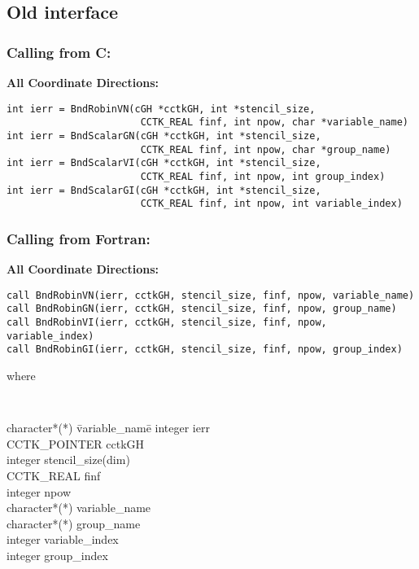 \documentclass{article}
\begin{document}
\subsection{Old interface}

\subsubsection*{Calling from C:}

{\bf All Coordinate Directions:}
\begin{verbatim}
int ierr = BndRobinVN(cGH *cctkGH, int *stencil_size,  
                       CCTK_REAL finf, int npow, char *variable_name)
int ierr = BndScalarGN(cGH *cctkGH, int *stencil_size,  
                       CCTK_REAL finf, int npow, char *group_name)
int ierr = BndScalarVI(cGH *cctkGH, int *stencil_size,  
                       CCTK_REAL finf, int npow, int group_index)
int ierr = BndScalarGI(cGH *cctkGH, int *stencil_size,  
                       CCTK_REAL finf, int npow, int variable_index)
\end{verbatim}


\subsubsection*{Calling from Fortran:}
{\bf All Coordinate Directions:}
\begin{verbatim}
call BndRobinVN(ierr, cctkGH, stencil_size, finf, npow, variable_name)
call BndRobinGN(ierr, cctkGH, stencil_size, finf, npow, group_name)
call BndRobinVI(ierr, cctkGH, stencil_size, finf, npow, variable_index)
call BndRobinGI(ierr, cctkGH, stencil_size, finf, npow, group_index)
\end{verbatim}
where
{\tt
\begin{tabbing}
character*(*) \= variable\_name\=\kill
integer \> ierr \\
CCTK\_POINTER \> cctkGH\\
integer \> stencil\_size(dim)\\
CCTK\_REAL \> finf \\
integer \> npow \\
character*(*) \> variable\_name\\
character*(*) \> group\_name\\
integer \> variable\_index\\
integer \> group\_index\\
\end{tabbing}
}
\end{document}
